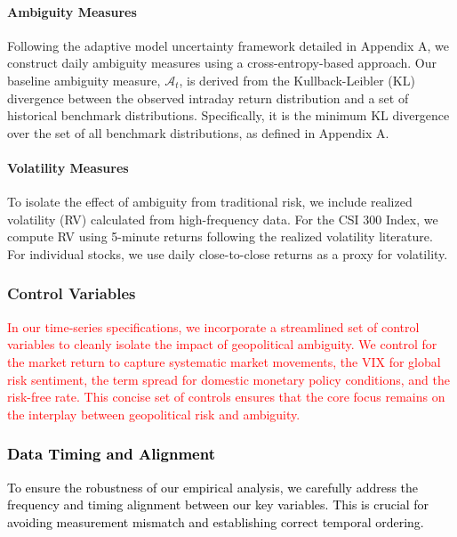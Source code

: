 \documentclass[preprint,12pt,authoryear]{elsarticle}
\begin{document}
\paragraph{Ambiguity Measures}
Following the adaptive model uncertainty framework detailed in Appendix A, we construct daily ambiguity measures using a cross-entropy-based approach. Our baseline ambiguity measure, $\mathcal{A}_t$, is derived from the Kullback-Leibler (KL) divergence between the observed intraday return distribution and a set of historical benchmark distributions. Specifically, it is the minimum KL divergence over the set of all benchmark distributions, as defined in Appendix A.


\paragraph{Volatility Measures}
To isolate the effect of ambiguity from traditional risk, we include realized volatility (RV) calculated from high-frequency data. For the CSI 300 Index, we compute RV using 5-minute returns following the realized volatility literature. For individual stocks, we use daily close-to-close returns as a proxy for volatility.

\subsubsection{Control Variables}

\textcolor{red}{In our time-series specifications, we incorporate a streamlined set of control variables to cleanly isolate the impact of geopolitical ambiguity. We control for the market return to capture systematic market movements, the VIX for global risk sentiment, the term spread for domestic monetary policy conditions, and the risk-free rate. This concise set of controls ensures that the core focus remains on the interplay between geopolitical risk and ambiguity.}

\subsubsection{\textcolor{black}{Data Timing and Alignment}}
\textcolor{black}{To ensure the robustness of our empirical analysis, we carefully address the frequency and timing alignment between our key variables. This is crucial for avoiding measurement mismatch and establishing correct temporal ordering.}
\end{document}
